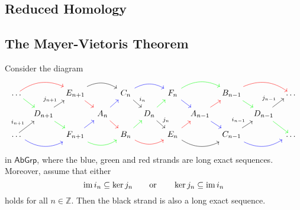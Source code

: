 \subsection*{Reduced Homology}


\subsection*{The Mayer-Vietoris Theorem}

\begin{proposition}
	\label{prop:commutative_braid}
	Consider the diagram
	\begin{equation*}
		\begin{tikzcd}[column sep=1.5ex, row sep=2ex]
			\dots \arrow[dr,green]\arrow[rr,red, bend left] & & E_{n + 1}\arrow[rr,bend left]\arrow[dr,red] & & C_n \arrow[rr,blue,bend left]\arrow[dr,"i_n"] & & F_n \arrow[rr,green,bend left]\arrow[dr,blue] & & B_{n - 1}\arrow[dr,green]\arrow[rr,bend left,red] & & \dots\\
			& D_{n + 1} \arrow[ur,"j_{n + 1}"]\arrow[dr,green] & & A_n \arrow[dr,red]\arrow[ur,blue] & & D_n \arrow[dr,"j_n"]\arrow[ur,green] & & A_{n - 1}\arrow[dr,blue]\arrow[ur,red] & & D_{n - 1} \arrow[dr,green]\arrow[ur,"j_{n - 1}"]\\
			\dots \arrow[ur,"i_{n + 1}"]\arrow[rr,blue,bend right] & & F_{n + 1} \arrow[ur,blue]\arrow[rr,bend right, green] & & B_n \arrow[rr,bend right,red]\arrow[ur,green] & & E_n \arrow[rr,bend right]\arrow[ur,red] & & C_{n - 1}\arrow[rr,bend right, blue]\arrow[ur,"i_{n - 1}"] & & \dots
		\end{tikzcd}
	\end{equation*}
	\noindent in $\mathsf{AbGrp}$, where the blue, green and red strands are long exact sequences. Moreover, assume that either
	\begin{equation*}
		\operatorname{im} i_n \subseteq \ker j_n \qquad \text{or} \qquad \ker j_n \subseteq \operatorname{im} i_n
	\end{equation*}
	\noindent holds for all $n \in \mathbb{Z}$. Then the black strand is also a long exact sequence.
\end{proposition}


